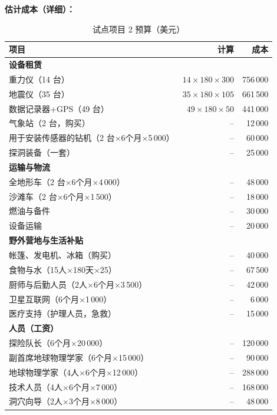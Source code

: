 \documentclass[12pt,a4paper]{article}
\theoremstyle{remark}
\begin{document}
	\textbf{估计成本（详细）：}
	\begin{table}[htbp]
		\centering
		\caption{试点项目 2 预算（美元）}
		\label{tab:budget-karst}
		\small
		\begin{tabular}{lrr}
			\toprule
			\textbf{项目} & \textbf{计算} & \textbf{成本} \\
			\midrule
			\multicolumn{3}{l}{\textbf{设备租赁}} \\
			重力仪（14 台） & $14\times180\times300$ & 756\,000 \\
			地震仪（35 台） & $35\times180\times105$ & 661\,500 \\
			数据记录器+GPS（49 台） & $49\times180\times50$ & 441\,000 \\
			气象站（2 台，购买） & – & 12\,000 \\
			用于安装传感器的钻机（2 台$\times$6个月$\times$5\,000） & – & 60\,000 \\
			探洞装备（一套） & – & 25\,000 \\
			\multicolumn{3}{l}{\textbf{运输与物流}} \\
			全地形车（2 台$\times$6个月$\times$4\,000） & – & 48\,000 \\
			沙滩车（2 台$\times$6个月$\times$1\,500） & – & 18\,000 \\
			燃油与备件 & – & 30\,000 \\
			设备运输 & – & 20\,000 \\
			\multicolumn{3}{l}{\textbf{野外营地与生活补贴}} \\
			帐篷、发电机、冰箱（购买） & – & 40\,000 \\
			食物与水（15人$\times$180天$\times$25） & – & 67\,500 \\
			厨师与后勤人员（2人$\times$6个月$\times$3\,500） & – & 42\,000 \\
			卫星互联网（6个月$\times$1\,000） & – & 6\,000 \\
			医疗支持（护理人员，急救） & – & 15\,000 \\
			\multicolumn{3}{l}{\textbf{人员（工资）}} \\
			探险队长（6个月$\times$20\,000） & – & 120\,000 \\
			副首席地球物理学家（6个月$\times$15\,000） & – & 90\,000 \\
			地球物理学家（4人$\times$6个月$\times$12\,000） & – & 288\,000 \\
			技术人员（4人$\times$6个月$\times$7\,000） & – & 168\,000 \\
			洞穴向导（2人$\times$3个月$\times$8\,000） & – & 48\,000 \\

\end{tabular}
\end{table}
\end{document}
